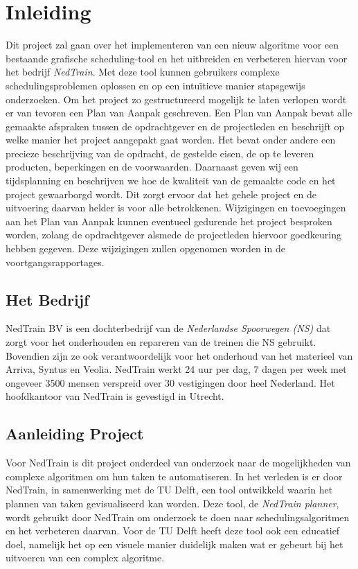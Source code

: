 \section{Inleiding}
Dit project zal gaan over het implementeren van een nieuw algoritme voor een bestaande grafische scheduling-tool en het uitbreiden en verbeteren hiervan voor het bedrijf \emph{NedTrain}. Met deze tool kunnen gebruikers complexe schedulingsproblemen oplossen en op een intu\"itieve manier stapsgewijs onderzoeken. Om het project zo gestructureerd mogelijk te laten verlopen wordt er van tevoren een Plan van Aanpak geschreven. Een Plan van Aanpak bevat alle gemaakte afspraken tussen de opdrachtgever en de projectleden en beschrijft op welke manier het project aangepakt gaat worden. Het bevat onder andere een precieze beschrijving van de opdracht, de gestelde eisen, de op te leveren producten, beperkingen en de voorwaarden. Daarnaast geven wij een tijdsplanning en beschrijven we hoe de kwaliteit van de gemaakte code en het project gewaarborgd wordt. Dit zorgt ervoor dat het gehele project en de uitvoering daarvan helder is voor alle betrokkenen. Wijzigingen en toevoegingen aan het Plan van Aanpak kunnen eventueel gedurende het project besproken worden, zolang de opdrachtgever alsmede de projectleden hiervoor goedkeuring hebben gegeven. Deze wijzigingen zullen opgenomen worden in de voortgangsrapportages.

\subsection{Het Bedrijf}
NedTrain BV is een dochterbedrijf van de \emph{Nederlandse Spoorwegen (NS)} dat zorgt voor het onderhouden en repareren van de treinen die NS gebruikt. \cite{NedTrainSite} Bovendien zijn ze ook verantwoordelijk voor het onderhoud van het materieel van Arriva, Syntus en Veolia. NedTrain werkt 24 uur per dag, 7 dagen per week met ongeveer 3500 mensen verspreid over 30 vestigingen door heel Nederland. Het hoofdkantoor van NedTrain is gevestigd in Utrecht.

\subsection{Aanleiding Project}
Voor NedTrain is dit project onderdeel van onderzoek naar de mogelijkheden van complexe algoritmen om hun taken te automatiseren. In het verleden is er door NedTrain, in samenwerking met de TU Delft, een tool ontwikkeld waarin het plannen van taken gevisualiseerd kan worden. Deze tool, de \emph{NedTrain planner}, wordt gebruikt door NedTrain om onderzoek te doen naar schedulingsalgoritmen en het verbeteren daarvan. Voor de TU Delft heeft deze tool ook een educatief doel, namelijk het op een visuele manier duidelijk maken wat er gebeurt bij het uitvoeren van een complex algoritme.

